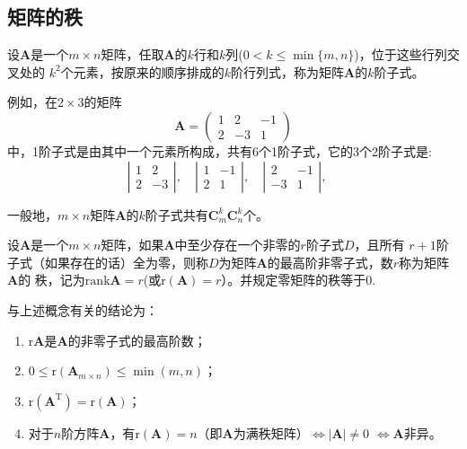 \subsection{矩阵的秩}
\begin{definition}[矩阵的子式]
    设$\boldsymbol{A}$是一个$m\times n$矩阵，任取$\boldsymbol{A}$的$k$行和$k$列($0<k\leq\min\{m,n\}$)，位于这些行列交叉处的
    $k^2$个元素，按原来的顺序排成的$k$阶行列式，称为矩阵$\boldsymbol{A}$的{\heiti $k$阶子式}。
\end{definition}

\begin{remark}
    例如，在$2\times 3$的矩阵
    $$\boldsymbol{A}=\left(\begin{array}{ccc}
        1 & 2 & -1 \\
        2 & -3 & 1
    \end{array}\right)$$
    中，1阶子式是由其中一个元素所构成，共有6个1阶子式，它的3个2阶子式是:
    $$\left|\begin{array}{ccc}
        1 & 2  \\
        2 & -3 
    \end{array}\right|,\quad
    \left|\begin{array}{ccc}
        1 & -1  \\
        2 & 1 
    \end{array}\right|,\quad
    \left|\begin{array}{ccc}
        2 & -1  \\
        -3 & 1 
    \end{array}\right|,\quad
    $$

    一般地，$m\times n$矩阵$\boldsymbol{A}$的$k$阶子式共有$\boldsymbol{C}_m^k\boldsymbol{C}_n^k$个。
\end{remark}

\begin{definition}[矩阵的秩]
    设$\boldsymbol{A}$是一个$m\times n$矩阵，如果$\boldsymbol{A}$中至少存在一个非零的$r$阶子式$D$，且所有
    $r+1$阶子式（如果存在的话）全为零，则称$D$为矩阵$\boldsymbol{A}$的最高阶非零子式，数$r$称为矩阵$\boldsymbol{A}$的
    {\heiti 秩}，记为${\mathrm{rank}\boldsymbol{A}=r}$(或$\mathrm{r(\boldsymbol{A})}=r$）。并规定零矩阵的秩等于0.
\end{definition}

\begin{remark}
    与上述概念有关的结论为：
    \begin{enumerate}[(1)]
        \item $\mathrm{r}\boldsymbol{A}$是$\boldsymbol{A}$的非零子式的最高阶数；
        \item $0\leq \mathrm{r}(\boldsymbol{A}_{m\times n})\leq \min(m,n)$；
        \item $\mathrm{r}(\boldsymbol{A}^\mathrm{T})=\mathrm{r}(\boldsymbol{A})$；
        \item 对于$n$阶方阵$\boldsymbol{A}$，有$\mathrm{r}(\boldsymbol{A})=n$（即$\boldsymbol{A}$为满秩矩阵）$\Leftrightarrow |\boldsymbol{A}| \neq 0 $ $\Leftrightarrow \boldsymbol{A}$非异。
    \end{enumerate}
\end{remark}

